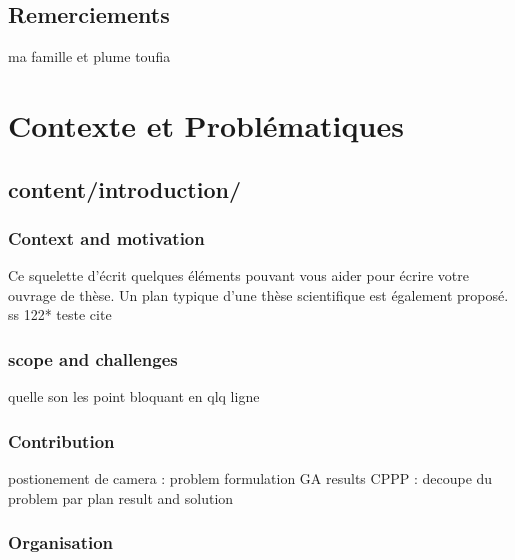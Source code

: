 \documentclass[french]{spimubphdthesis}
\begin{document}
 

\chapter*{Remerciements}
 ma famille  et plume toufia 
\tableofcontents

\mainmatter
 
\part{Contexte et Problématiques}

\chapter{content/introduction/}
  
\section{Context and motivation}

Ce squelette d'écrit quelques éléments pouvant vous aider pour écrire votre ouvrage de thèse.
Un plan typique d'une thèse scientifique est également proposé. ss\cite{Wang1996} 122* 
teste cite \cite{118*}


\section{scope and challenges}
quelle son les point  bloquant  en qlq ligne 
\section{Contribution }
postionement de  camera :  problem formulation  
						   GA 
						   results 
CPPP :  decoupe du problem
		par plan
		result and solution 
\section{Organisation }
\end{document}
